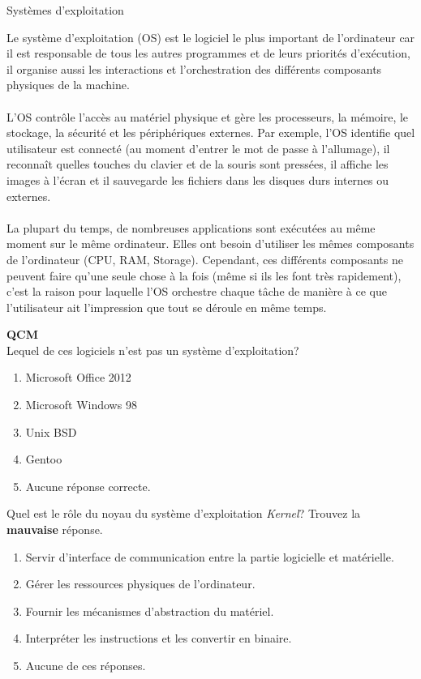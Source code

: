 \begin{section}{Systèmes d'exploitation}
    
Le système d'exploitation (OS) est le logiciel le plus important de l'ordinateur car il est responsable de tous les autres programmes et de leurs priorités d'exécution, il organise aussi les interactions et l'orchestration des différents composants physiques de la machine.
\\\\
L'OS contrôle l'accès au matériel physique et gère les processeurs, la mémoire, le stockage, la sécurité et les périphériques externes. Par exemple, l'OS identifie quel utilisateur est connecté (au moment d'entrer le mot de passe à l'allumage), il reconnaît quelles touches du clavier et de la souris sont pressées, il affiche les images à l'écran et il sauvegarde les fichiers dans les disques durs internes ou externes.
\\\\
La plupart du temps, de nombreuses applications sont exécutées au même moment sur le même ordinateur. Elles ont besoin d'utiliser les mêmes composants de l'ordinateur (CPU, RAM, Storage). Cependant, ces différents composants ne peuvent faire qu'une seule chose à la fois (même si ils les font très rapidement), c'est la raison pour laquelle l'OS orchestre chaque tâche de manière à ce que l'utilisateur ait l'impression que tout se déroule en même temps.
\\

    \begin{Exercice}[5 minutes]  \textbf{QCM}\\
    Lequel de ces logiciels n'est pas un système d'exploitation?
        \begin{enumerate}
            \item Microsoft Office 2012
            \item Microsoft Windows 98
            \item Unix BSD
            \item Gentoo
            \item Aucune réponse correcte.
        \end{enumerate}
    \end{Exercice}

    \begin{Exercice}[5 minutes]
        Quel est le rôle du noyau du système d'exploitation \textit{Kernel}? Trouvez la \textbf{mauvaise} réponse.
        \begin{enumerate}
            \item Servir d'interface de communication entre la partie logicielle et matérielle.
            \item Gérer les ressources physiques de l'ordinateur.
            \item Fournir les mécanismes d'abstraction du matériel.
            \item Interpréter les instructions et les convertir en binaire.
            \item Aucune de ces réponses.
        \end{enumerate}
    \end{Exercice}
    

\end{section}
